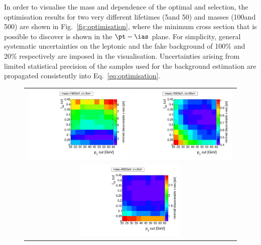 In order to visualise the mass and \ctau dependence of the optimal \pt and \ias selection, the optimisation results for two very different lifetimes (5\cm and 50\cm) and masses (100\gev and 500\gev) are shown in Fig.~\ref{fig:optimisation}, where the minimum cross section that is possible to discover is shown in the $\pt-\ias$ plane.
For simplicity, general systematic uncertainties on the leptonic and the fake background of 100\% and 20\% respectively are imposed in the visualisation.
Uncertainties arising from limited statistical precision of the samples used for the background estimation are propagated consistently into Eq.~\eqref{eq:optimisation}.
\begin{figure}[!h]
  \centering 
  \vspace{50pt}
  \begin{tabular}{c}
    \includegraphics[width=0.49\textwidth]{figures/analysis/Optimisation/Madgraph_signal_mass_100_ctau_5cm_ECaloLe5_SOverDeltaBStatPlusSys.pdf} 
    \includegraphics[width=0.49\textwidth]{figures/analysis/Optimisation/Madgraph_signal_mass_100_ctau_50cm_ECaloLe5_SOverDeltaBStatPlusSys.pdf}\\ 
    \includegraphics[width=0.49\textwidth]{figures/analysis/Optimisation/Madgraph_signal_mass_500_ctau_5cm_ECaloLe5_SOverDeltaBStatPlusSys.pdf}

\end{tabular}
\end{figure}
